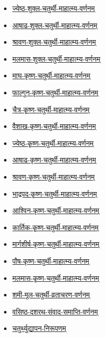 {\begin{center}
\begin{itemize}
        \item \hyperref[sec:jyeshtha-shukla-chaturthi-mahatmya-varnanam]{ज्येष्ठ-शुक्ल-चतुर्थी-माहात्म्य-वर्णनम्}
        \item \hyperref[sec:ashadha-shukla-chaturthi-mahatmya-varnanam]{आषाढ-शुक्ल-चतुर्थी-माहात्म्य-वर्णनम्}
        \item \hyperref[sec:shravana-shukla-chaturthi-mahatmya-varnanam]{श्रावण-शुक्ल-चतुर्थी-माहात्म्य-वर्णनम्}
        \item \hyperref[sec:malamasa-shukla-chaturthi-mahatmya-varnanam]{मलमास-शुक्ल-चतुर्थी-माहात्म्य-वर्णनम्}
        \item \hyperref[sec:magha-krishna-chaturthi-mahatmya-varnanam]{माघ-कृष्ण-चतुर्थी-माहात्म्य-वर्णनम्}
        \item \hyperref[sec:phalguna-krishna-chaturthi-mahatmya-varnanam]{फाल्गुन-कृष्ण-चतुर्थी-माहात्म्य-वर्णनम्}
        \item \hyperref[sec:chaitra-krishna-chaturthi-mahatmya-varnanam]{चैत्र-कृष्ण-चतुर्थी-माहात्म्य-वर्णनम्}
        \item \hyperref[sec:vaishakha-krishna-chaturthi-mahatmya-varnanam]{वैशाख-कृष्ण-चतुर्थी-माहात्म्य-वर्णनम्}
        \item \hyperref[sec:jyeshtha-krishna-chaturthi-mahatmya-varnanam]{ज्येष्ठ-कृष्ण-चतुर्थी-माहात्म्य-वर्णनम्}
        \item \hyperref[sec:ashadha-krishna-chaturthi-mahatmya-varnanam]{आषाढ-कृष्ण-चतुर्थी-माहात्म्य-वर्णनम्}
        \item \hyperref[sec:shravana-krishna-chaturthi-mahatmya-varnanam]{श्रावण-कृष्ण-चतुर्थी-माहात्म्य-वर्णनम्}
        \item \hyperref[sec:bhadrapada-krishna-chaturthi-mahatmya-varnanam]{भाद्रपद-कृष्ण-चतुर्थी-माहात्म्य-वर्णनम्}
        \item \hyperref[sec:ashvina-krishna-chaturthi-mahatmya-varnanam]{आश्विन-कृष्ण-चतुर्थी-माहात्म्य-वर्णनम्}
        \item \hyperref[sec:kartika-krishna-chaturthi-mahatmya-varnanam]{कार्तिक-कृष्ण-चतुर्थी-माहात्म्य-वर्णनम्}
        \item \hyperref[sec:margashirsha-krishna-chaturthi-mahatmya-varnanam]{मार्गशीर्ष-कृष्ण-चतुर्थी-माहात्म्य-वर्णनम्}
        \item \hyperref[sec:pausha-krishna-chaturthi-mahatmya-varnanam]{पौष-कृष्ण-चतुर्थी-माहात्म्य-वर्णनम्}
        \item \hyperref[sec:malamasa-krishna-chaturthi-mahatmya-varnanam]{मलमास-कृष्ण-चतुर्थी-माहात्म्य-वर्णनम्}
        \item \hyperref[sec:shami-mula-chaturthi-vratacharana-varnanam]{शमी-मूल-चतुर्थी-व्रताचरण-वर्णनम्}
        \item \hyperref[sec:vasishtha-dasharatha-samvada-samapti-varnanam]{वसिष्ठ-दशरथ-संवाद-समाप्ति-वर्णनम्}
        \item \hyperref[sec:chaturthyudyapana-nirupanam]{चतुर्थ्युद्यापन-निरूपणम्}
    \end{itemize}
    \clearpage
    
\end{center}
}{}
